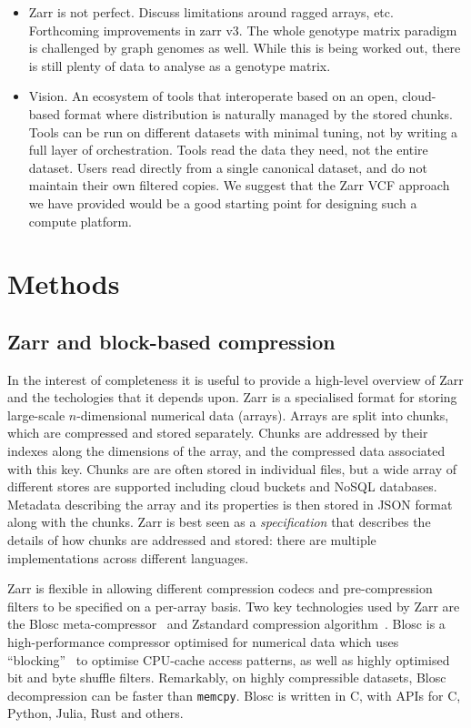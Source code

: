 \documentclass[a4paper,num-refs]{oup-contemporary}
\begin{document}
\begin{itemize}
\item Zarr is not perfect. Discuss limitations around ragged arrays,
etc. Forthcoming improvements in zarr v3. The whole genotype matrix
paradigm is challenged by graph genomes as well. While this is
being worked out, there is still plenty of data to analyse as a
genotype matrix.

\item Vision. An ecosystem of tools that interoperate
based on an open, cloud-based format where distribution is naturally
managed by the stored chunks. Tools can be run on different datasets
with minimal tuning, not by writing a full layer of orchestration.
Tools read the data they need, not the entire dataset. Users read
directly from a single canonical dataset, and do not maintain
their own filtered copies. We suggest that the Zarr VCF approach
we have provided would be a good starting point for designing
such a compute platform.

\end{itemize}

\section{Methods}

\subsection{Zarr and block-based compression}
In the interest of completeness it is useful to provide a high-level overview
of Zarr and the techologies that it depends upon. Zarr is a specialised format
for storing large-scale $n$-dimensional numerical data (arrays). Arrays
are split into chunks, which are compressed and stored separately. Chunks are 
addressed by their indexes along the dimensions of the array, and the 
compressed data associated with this key. Chunks are
are often stored in individual files, but a wide array of different
stores are supported including cloud buckets and NoSQL databases. 
Metadata describing the array and its properties is then stored 
in JSON format along with the chunks. Zarr is best seen as a 
\emph{specification} that describes the details of how chunks are 
addressed and stored: there are multiple implementations across
different languages.

Zarr is flexible in allowing different compression codecs and 
pre-compression filters to be specified on a per-array basis.
Two key technologies used by Zarr are the Blosc
meta-compressor~\cite{alted2010modern}
and Zstandard compression algorithm~\citep{collet2021rfc}.
Blosc is a high-performance compressor optimised for numerical
data which uses ``blocking''~\citep{alted2010modern} to 
optimise CPU-cache access patterns, as well as highly optimised
bit and byte shuffle filters.  Remarkably, on highly 
compressible datasets, Blosc decompression can be faster 
than \texttt{memcpy}.
Blosc is written in C, with APIs for C, Python, Julia, Rust
and others.
\end{document}
